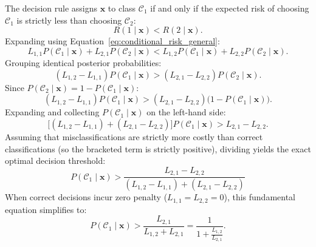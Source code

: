 The decision rule assigns $\mathbf{x}$ to class $\mathcal{C}_1$ if and only if the expected risk of choosing $\mathcal{C}_1$ is strictly less than choosing $\mathcal{C}_2$:
\begin{equation}
R(1 \mid \mathbf{x}) < R(2 \mid \mathbf{x}).
\end{equation}
Expanding using Equation~\eqref{eq:conditional_risk_general}:
\begin{equation}
L_{1, 1} P(\mathcal{C}_1 \mid \mathbf{x}) + L_{2, 1} P(\mathcal{C}_2 \mid \mathbf{x}) < L_{1, 2} P(\mathcal{C}_1 \mid \mathbf{x}) + L_{2, 2} P(\mathcal{C}_2 \mid \mathbf{x}).
\end{equation}
Grouping identical posterior probabilities:
\begin{equation}
(L_{1, 2} - L_{1, 1}) P(\mathcal{C}_1 \mid \mathbf{x}) > (L_{2, 1} - L_{2, 2}) P(\mathcal{C}_2 \mid \mathbf{x}).
\end{equation}
Since $P(\mathcal{C}_2 \mid \mathbf{x}) = 1 - P(\mathcal{C}_1 \mid \mathbf{x})$:
\begin{equation}
(L_{1, 2} - L_{1, 1}) P(\mathcal{C}_1 \mid \mathbf{x}) > (L_{2, 1} - L_{2, 2})\Big( 1 - P(\mathcal{C}_1 \mid \mathbf{x}) \Big).
\end{equation}
Expanding and collecting $P(\mathcal{C}_1 \mid \mathbf{x})$ on the left-hand side:
\begin{equation}
\Big[ (L_{1, 2} - L_{1, 1}) + (L_{2, 1} - L_{2, 2}) \Big] P(\mathcal{C}_1 \mid \mathbf{x}) > L_{2, 1} - L_{2, 2}.
\end{equation}
Assuming that misclassifications are strictly more costly than correct classifications (so the bracketed term is strictly positive), dividing yields the exact optimal decision threshold:
\begin{equation}
\boxed{ P(\mathcal{C}_1 \mid \mathbf{x}) > \frac{L_{2, 1} - L_{2, 2}}{(L_{1, 2} - L_{1, 1}) + (L_{2, 1} - L_{2, 2})} }
\label{eq:asymmetric_decision_threshold}
\end{equation}
When correct decisions incur zero penalty ($L_{1, 1} = L_{2, 2} = 0$), this fundamental equation simplifies to:
\begin{equation}
P(\mathcal{C}_1 \mid \mathbf{x}) > \frac{L_{2, 1}}{L_{1, 2} + L_{2, 1}} = \frac{1}{1 + \frac{L_{1, 2}}{L_{2, 1}}}.
\label{eq:simplified_asymmetric_threshold}
\end{equation}

